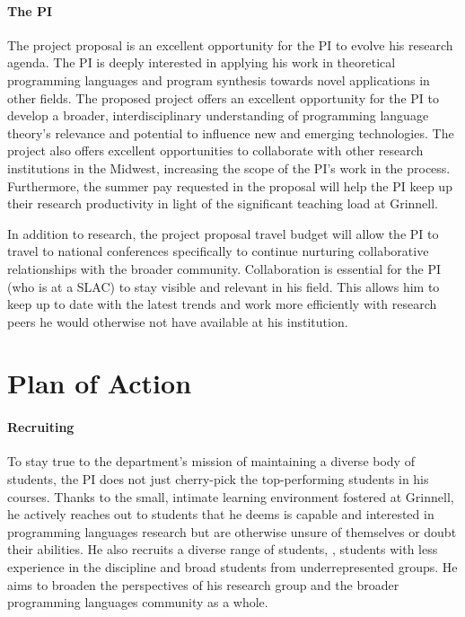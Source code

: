\documentclass[11pt]{article}
\begin{document}
\paragraph{The PI}
The project proposal is an excellent opportunity for the PI to evolve his research agenda.
The PI is deeply interested in applying his work in theoretical programming languages and program synthesis towards novel applications in other fields.
The proposed project offers an excellent opportunity for the PI to develop a broader, interdisciplinary understanding of programming language theory's relevance and potential to influence new and emerging technologies.
The project also offers excellent opportunities to collaborate with other research institutions in the Midwest, increasing the scope of the PI's work in the process.
Furthermore, the summer pay requested in the proposal will help the PI keep up their research productivity in light of the significant teaching load at Grinnell.

In addition to research, the project proposal travel budget will allow the PI to travel to national conferences specifically to continue nurturing collaborative relationships with the broader community.
Collaboration is essential for the PI (who is at a SLAC) to stay visible and relevant in his field.
This allows him to keep up to date with the latest trends and work more efficiently with research peers he would otherwise not have available at his institution.

\section{Plan of Action}

\paragraph{Recruiting}

To stay true to the department's mission of maintaining a diverse body of students, the PI does not just cherry-pick the top-performing students in his courses.
Thanks to the small, intimate learning environment fostered at Grinnell, he actively reaches out to students that he deems is capable and interested in programming languages research but are otherwise unsure of themselves or doubt their abilities.
He also recruits a diverse range of students, \eg, students with less experience in the discipline and broad students from underrepresented groups.
He aims to broaden the perspectives of his research group and the broader programming languages community as a whole.
\end{document}
